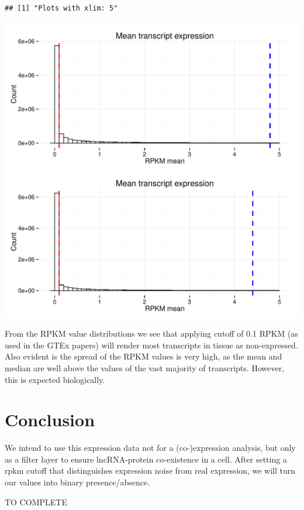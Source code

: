 \documentclass{article}\usepackage[]{graphicx}\usepackage[]{color}
\makeatletter
\def\maxwidth{ %
  \ifdim\Gin@nat@width>\linewidth
    \linewidth
  \else
    \Gin@nat@width
  \fi
}
\newenvironment{kframe}{%
 \def\at@end@of@kframe{}%
 \ifinner\ifhmode%
  \def\at@end@of@kframe{\end{minipage}}%
  \begin{minipage}{\columnwidth}%
 \fi\fi%
 \def\FrameCommand##1{\hskip\@totalleftmargin \hskip-\fboxsep
 \colorbox{shadecolor}{##1}\hskip-\fboxsep
     \hskip-\linewidth \hskip-\@totalleftmargin \hskip\columnwidth}%
 \MakeFramed {\advance\hsize-\width
   \@totalleftmargin\z@ \linewidth\hsize
   \@setminipage}}%
 {\par\unskip\endMakeFramed%
 \at@end@of@kframe}
\newenvironment{knitrout}{}{} %
\makeatother
\begin{document}
\begin{knitrout}
\begin{kframe}
\begin{verbatim}
## [1] "Plots with xlim: 5"
\end{verbatim}
\end{kframe}
\includegraphics[width=\maxwidth]{figure/transcript_expression_averages-2} 

\end{knitrout}

From the RPKM value distributions we see that applying cutoff of 0.1 RPKM (as used in the GTEx papers) will render most transcripts in tissue as non-expressed. Also evident is the spread of the RPKM values is very high, as the mean and median are well above the values of the vast majority of transcripts. However, this is expected biologically.\par

\section{Conclusion}

We intend to use this expression data not for a (co-)expression analysis, but only as a filter layer to ensure lncRNA-protein co-existence in a cell. After setting a rpkm cutoff that distinguishes expression noise from real expression, we will turn our values into binary presence/absence.\par

TO COMPLETE
\end{document}
